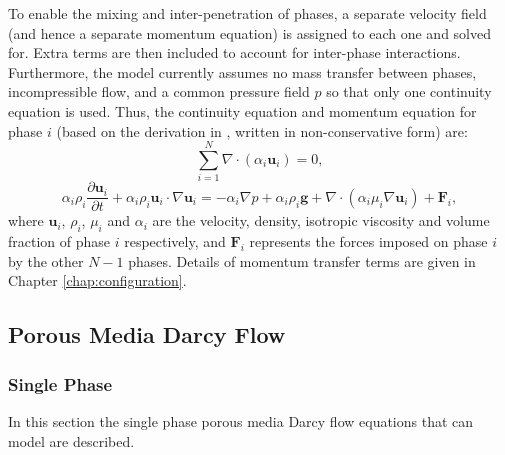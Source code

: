 To enable the mixing and inter-penetration of phases, a separate velocity field (and hence a separate momentum equation) is assigned to each one and solved for. Extra terms are then included to account for inter-phase interactions. Furthermore, the model currently assumes no mass transfer between phases, incompressible flow, and a common pressure field $p$ so that only one continuity equation is used. Thus, the continuity equation and momentum equation for phase $i$ (based on the derivation in \cite{ishii1975}, written in non-conservative form) are:
\begin{equation}
\sum_{i=1}^N\nabla\cdot\left(\alpha_i\mathbf{u}_i\right) = 0,
\end{equation}
\begin{equation}
\alpha_i\rho_i\frac{\partial \mathbf{u}_i}{\partial t} +
\alpha_i\rho_i\mathbf{u}_i\cdot\nabla\mathbf{u}_i =
-\alpha_i\nabla p + \alpha_i\rho_i\mathbf{g} +
\nabla\cdot\left(\alpha_i\mu_i\nabla\mathbf{u}_i\right) +
\mathbf{F}_i,
\end{equation}
where $\mathbf{u}_i$, $\rho_i$, $\mu_i$ and $\alpha_i$ are the velocity, density, isotropic viscosity and volume fraction of phase $i$ respectively, and $\mathbf{F}_i$ represents the forces imposed on phase $i$ by the other $N-1$ phases. Details of momentum transfer terms are given in Chapter \ref{chap:configuration}.

\subsection{Porous Media Darcy Flow}
\label{sec:porous_media_darcy_flow_equations}

\subsubsection{Single Phase}

In this section the single phase porous media Darcy flow equations that \fluidity can model are described.

